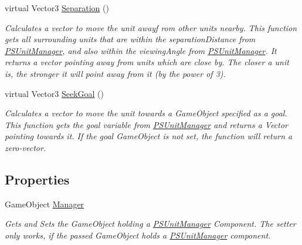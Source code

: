\begin{DoxyCompactItemize}
virtual Vector3 \hyperlink{class_p_s_flocking_1_1_p_s_flocking_unit_af486901d480a5520aeae135d46635e60}{Separation} ()
\begin{DoxyCompactList}\small\item\em Calculates a vector to move the unit awayf rom other units nearby. This function gets all surrounding units that are within the separation\+Distance from \hyperlink{class_p_s_flocking_1_1_p_s_unit_manager}{P\+S\+Unit\+Manager}, and also within the viewing\+Angle from \hyperlink{class_p_s_flocking_1_1_p_s_unit_manager}{P\+S\+Unit\+Manager}. It returns a vector pointing away from units which are close by. The closer a unit is, the stronger it will point away from it (by the power of 3). \end{DoxyCompactList}\item 
virtual Vector3 \hyperlink{class_p_s_flocking_1_1_p_s_flocking_unit_ab2ce12145c79e5e179f841412ed2febb}{Seek\+Goal} ()
\begin{DoxyCompactList}\small\item\em Calculates a vector to move the unit towards a Game\+Object specified as a goal. This function gets the goal variable from \hyperlink{class_p_s_flocking_1_1_p_s_unit_manager}{P\+S\+Unit\+Manager} and returns a Vector pointing towards it. If the goal Game\+Object is not set, the function will return a zero-\/vector. \end{DoxyCompactList}\end{DoxyCompactItemize}
\subsection*{Properties}
\begin{DoxyCompactItemize}
\item 
\mbox{\label{class_p_s_flocking_1_1_p_s_flocking_unit_ab4a20f9e1a65d566b629c59340d537dd}} 
Game\+Object \hyperlink{class_p_s_flocking_1_1_p_s_flocking_unit_ab4a20f9e1a65d566b629c59340d537dd}{Manager}
\begin{DoxyCompactList}\small\item\em Gets and Sets the Game\+Object holding a \hyperlink{class_p_s_flocking_1_1_p_s_unit_manager}{P\+S\+Unit\+Manager} Component. The setter only works, if the passed Game\+Object holds a \hyperlink{class_p_s_flocking_1_1_p_s_unit_manager}{P\+S\+Unit\+Manager} component. \end{DoxyCompactList}\end{DoxyCompactItemize}


